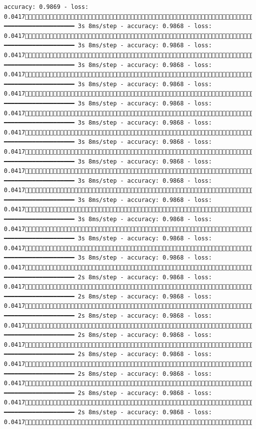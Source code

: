 \documentclass[
  letterpaper,
  DIV=11,
  numbers=noendperiod]{scrreprt}
\begin{document}
\begin{verbatim}
accuracy: 0.9869 - loss: 0.04171389/1875 ━━━━━━━━━━━━━━━━━━━━ 3s 8ms/step - accuracy: 0.9868 - loss: 0.04171396/1875 ━━━━━━━━━━━━━━━━━━━━ 3s 8ms/step - accuracy: 0.9868 - loss: 0.04171403/1875 ━━━━━━━━━━━━━━━━━━━━ 3s 8ms/step - accuracy: 0.9868 - loss: 0.04171410/1875 ━━━━━━━━━━━━━━━━━━━━ 3s 8ms/step - accuracy: 0.9868 - loss: 0.04171417/1875 ━━━━━━━━━━━━━━━━━━━━ 3s 8ms/step - accuracy: 0.9868 - loss: 0.04171424/1875 ━━━━━━━━━━━━━━━━━━━━ 3s 8ms/step - accuracy: 0.9868 - loss: 0.04171432/1875 ━━━━━━━━━━━━━━━━━━━━ 3s 8ms/step - accuracy: 0.9868 - loss: 0.04171439/1875 ━━━━━━━━━━━━━━━━━━━━ 3s 8ms/step - accuracy: 0.9868 - loss: 0.04171446/1875 ━━━━━━━━━━━━━━━━━━━━ 3s 8ms/step - accuracy: 0.9868 - loss: 0.04171453/1875 ━━━━━━━━━━━━━━━━━━━━ 3s 8ms/step - accuracy: 0.9868 - loss: 0.04171460/1875 ━━━━━━━━━━━━━━━━━━━━ 3s 8ms/step - accuracy: 0.9868 - loss: 0.04171467/1875 ━━━━━━━━━━━━━━━━━━━━ 3s 8ms/step - accuracy: 0.9868 - loss: 0.04171474/1875 ━━━━━━━━━━━━━━━━━━━━ 3s 8ms/step - accuracy: 0.9868 - loss: 0.04171481/1875 ━━━━━━━━━━━━━━━━━━━━ 2s 8ms/step - accuracy: 0.9868 - loss: 0.04171488/1875 ━━━━━━━━━━━━━━━━━━━━ 2s 8ms/step - accuracy: 0.9868 - loss: 0.04171496/1875 ━━━━━━━━━━━━━━━━━━━━ 2s 8ms/step - accuracy: 0.9868 - loss: 0.04171504/1875 ━━━━━━━━━━━━━━━━━━━━ 2s 8ms/step - accuracy: 0.9868 - loss: 0.04171511/1875 ━━━━━━━━━━━━━━━━━━━━ 2s 8ms/step - accuracy: 0.9868 - loss: 0.04171519/1875 ━━━━━━━━━━━━━━━━━━━━ 2s 8ms/step - accuracy: 0.9868 - loss: 0.04171527/1875 ━━━━━━━━━━━━━━━━━━━━ 2s 8ms/step - accuracy: 0.9868 - loss: 0.04171534/1875 ━━━━━━━━━━━━━━━━━━━━ 2s 8ms/step - accuracy: 0.9868 - loss: 0.04171542/1875 
\end{verbatim}
\end{document}
